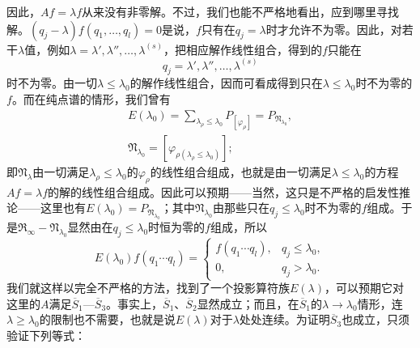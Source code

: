 \documentclass[fontsize=13pt,twoside,openany,headings=normal,parskip=false,bookmarkpackage=false,DIV=calc]{scrbook}
\begin{document}
\hypertarget{origpage-67}{}\label{origpage-67}因此，$Af=\lambda f$从来没有非零解。不过，我们也能不严格地看出，应到哪里寻找解。$(q_j-\lambda)f(q_1,\allowbreak \ldots,\allowbreak q_l)=0$是说，$f$只有在$q_j=\lambda$时才允许不为零。因此，对若干$\lambda$值，例如$\lambda=\lambda',\allowbreak \lambda'',\allowbreak \ldots,\allowbreak \lambda^{(s)}$，把相应解作线性组合，得到的$f$只能在
\[
q_j=\lambda',\lambda'',\ldots,\lambda^{(s)}
\]
时不为零。由一切$\lambda\leq\lambda_0$的解作线性组合，因而可看成得到只在$\lambda\leq\lambda_0$时不为零的$f$。而在纯点谱的情形，我们曾有
\begin{gather*}
E(\lambda_0)=\sum_{\lambda_\rho\leq\lambda_0}P_{[\varphi_\rho]}=P_{\mathfrak{N}_{\lambda_0}},\\
\mathfrak{N}_{\lambda_0}=[\varphi_{\rho(\lambda_\rho\leq\lambda_0)}];
\end{gather*}
即$\mathfrak{N}_\lambda$由一切满足$\lambda_\rho\leq\lambda_0$的$\varphi_\rho$的线性组合组成，也就是由一切满足$\lambda\leq\lambda_0$的方程$Af=\lambda f$的解的线性组合组成。因此可以预期——当然，这只是不严格的启发性推论——这里也有$E(\lambda_0)=P_{\mathfrak{N}_{\lambda_0}}$；其中$\mathfrak{N}_{\lambda_0}$由那些只在$q_j\leq\lambda_0$时不为零的$f$组成。于是$\mathfrak{R}_\infty-\mathfrak{N}_{\lambda_0}$显然由在$q_j\leq\lambda_0$时恒为零的$f$组成，所以
\[
E(\lambda_0)f(q_1\cdots q_l)=
\begin{cases}f(q_1\cdots q_l),&q_j\leq\lambda_0,\\0,&q_j>\lambda_0.\end{cases}
\]
我们就这样以完全不严格的方法，找到了一个投影算符族$E(\lambda)$，可以预期它对这里的$A$满足$\hyperref[cond:II.Sbar1]{\overline{S}_1}$—$\hyperref[cond:II.Sbar3]{\overline{S}_3}$。事实上，$\hyperref[cond:II.Sbar1]{\overline{S}_1}$、$\hyperref[cond:II.Sbar2]{\overline{S}_2}$显然成立；而且，在$\hyperref[cond:II.Sbar1]{\overline{S}_1}$的$\lambda\to\lambda_0$情形，连$\lambda\geq\lambda_0$的限制也不需要，也就是说$E(\lambda)$对于$\lambda$处处连续。为证明$\hyperref[cond:II.Sbar3]{\overline{S}_3}$也成立，只须验证下列等式：
\end{document}

